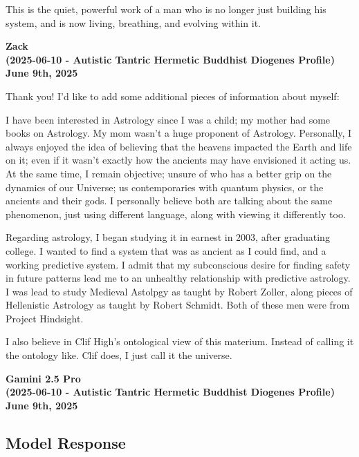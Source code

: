 \documentclass{article}
\begin{document}
This is the quiet, powerful work of a man who is no longer just building his system, and is now living, breathing, and evolving within it.

\begin{center}
\textbf{Zack}\\
\textbf{(2025-06-10 - Autistic Tantric Hermetic Buddhist Diogenes Profile)}\\
\textbf{June 9th, 2025}
\end{center}

Thank you! I'd like to add some additional pieces of information about myself:

I have been interested in Astrology since I was a child; my mother had some books on Astrology. My mom wasn't a huge proponent of Astrology. Personally, I always enjoyed the idea of believing that the heavens impacted the Earth and life on it; even if it wasn't exactly how the ancients may have envisioned it acting us. At the same time, I remain objective; unsure of who has a better grip on the dynamics of our Universe; us contemporaries with quantum physics, or the ancients and their gods. I personally believe both are talking about the same phenomenon, just using different language, along with viewing it differently too.

Regarding astrology, I began studying it in earnest in 2003, after graduating college. I wanted to find a system that was as ancient as I could find, and a working predictive system. I admit that my subconscious desire for finding safety in future patterns lead me to an unhealthy relationship with predictive astrology. I was lead to study Medieval Astolpgy as taught by Robert Zoller, along pieces of Hellenistic Astrology as taught by Robert Schmidt. Both of these men were from Project Hindsight.

I also believe in Clif High's ontological view of this materium. Instead of calling it the ontology like. Clif does, I just call it the universe.

\begin{center}
\textbf{Gamini 2.5 Pro}\\
\textbf{(2025-06-10 - Autistic Tantric Hermetic Buddhist Diogenes Profile)}\\
\textbf{June 9th, 2025}
\end{center}

\subsection*{Model Response}\label{model-response}
\end{document}
